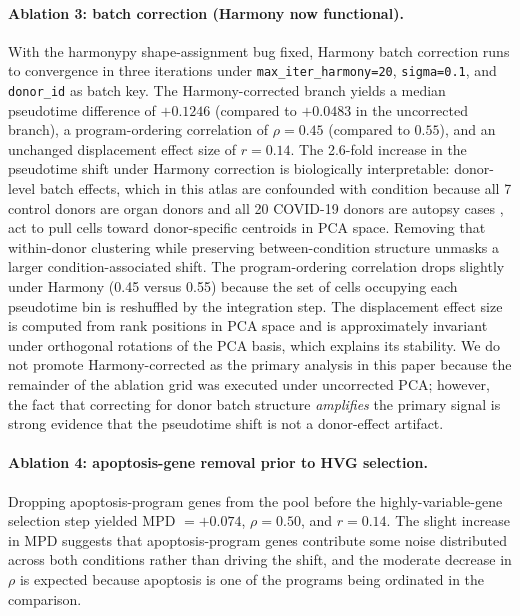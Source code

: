 \documentclass[11pt]{article}
\begin{document}
\paragraph{Ablation 3: batch correction (Harmony now functional).} With the harmonypy shape-assignment bug fixed, Harmony batch correction runs to convergence in three iterations under \texttt{max\_iter\_harmony=20}, \texttt{sigma=0.1}, and \texttt{donor\_id} as batch key. The Harmony-corrected branch yields a median pseudotime difference of $+0.1246$ (compared to $+0.0483$ in the uncorrected branch), a program-ordering correlation of $\rho = 0.45$ (compared to $0.55$), and an unchanged displacement effect size of $r = 0.14$. The 2.6-fold increase in the pseudotime shift under Harmony correction is biologically interpretable: donor-level batch effects, which in this atlas are confounded with condition because all 7 control donors are organ donors and all 20 COVID-19 donors are autopsy cases \citep{Melms2021}, act to pull cells toward donor-specific centroids in PCA space. Removing that within-donor clustering while preserving between-condition structure unmasks a larger condition-associated shift. The program-ordering correlation drops slightly under Harmony (0.45 versus 0.55) because the set of cells occupying each pseudotime bin is reshuffled by the integration step. The displacement effect size is computed from rank positions in PCA space and is approximately invariant under orthogonal rotations of the PCA basis, which explains its stability. We do not promote Harmony-corrected as the primary analysis in this paper because the remainder of the ablation grid was executed under uncorrected PCA; however, the fact that correcting for donor batch structure \emph{amplifies} the primary signal is strong evidence that the pseudotime shift is not a donor-effect artifact.

\paragraph{Ablation 4: apoptosis-gene removal prior to HVG selection.} Dropping apoptosis-program genes from the pool before the highly-variable-gene selection step yielded MPD $= +0.074$, $\rho = 0.50$, and $r = 0.14$. The slight increase in MPD suggests that apoptosis-program genes contribute some noise distributed across both conditions rather than driving the shift, and the moderate decrease in $\rho$ is expected because apoptosis is one of the programs being ordinated in the comparison.
\end{document}
